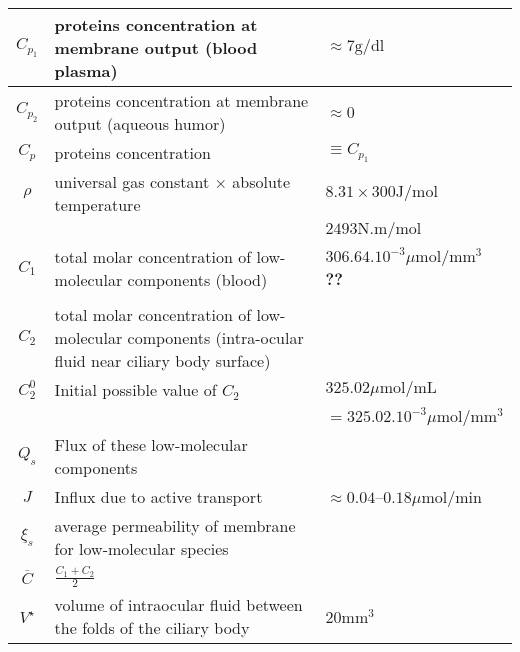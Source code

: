 \documentclass[11pt]{article}
\begin{document}
\begin{center}
\begin{tabular}{|c|p{}|l|}
 \hline
$ C_{p_1}$& proteins concentration at membrane output (blood plasma) & $\approx 7 \mathrm{g}/\mathrm{dl}$ \\
\hline
$C_{p_2}$ & proteins concentration at membrane output (aqueous humor) &$\approx 0$ \\
\hline
$C_p$ & proteins concentration & $\equiv C_{p_1}$ \\
\hline
$\rho$ & universal gas constant $\times$  absolute temperature &$8.31 \times 300 \mathrm{J}/\mathrm{mol} $\\
&& $2493 \mathrm{N}.\mathrm{m}/\mathrm{mol}$\\
\hline
$C_1$& total molar concentration of low-molecular components (blood) & $306.64.10^{-3} \mu \mathrm{mol}/\mathrm{mm}^3$ \textbf{??}\cite{to2002mechanism}\\\\
\hline
$C_2$& total molar concentration of low-molecular components (intra-ocular fluid near ciliary body surface) & \\
\hline
$C_2^0$&Initial possible value of $C_2$&$325.02 \mu \mathrm{mol}/\mathrm{mL}$ \\
& & $ = 325.02.10^{-3}	 \mu \mathrm{mol}/\mathrm{mm^3}$
\cite{to2002mechanism}\\
\hline
$Q_s$ & Flux of these low-molecular components & \\
\hline
$J$ & Influx due to active transport & $\approx 0.04$--$0.18 \mu \mathrm{mol} / \mathrm{min}$\\
\hline
$\xi_s$ & average permeability of membrane for low-molecular species& \\
\hline
$\overline{C}$& $\displaystyle{\frac{C_1+C_2}{2}}$& \\
\hline

$V^\star$ & volume of intraocular fluid between the folds of the ciliary body & $20 \mathrm{mm}^3 $\\
\hline

\end{tabular}
\end{center}
\end{document}
